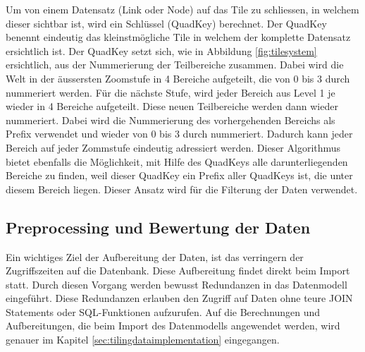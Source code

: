 Um von einem Datensatz (Link oder Node) auf das Tile zu schliessen, in welchem dieser sichtbar ist, wird ein Schlüssel (QuadKey) berechnet. Der QuadKey benennt eindeutig das kleinstmögliche Tile in welchem der komplette Datensatz ersichtlich ist. Der QuadKey setzt sich, wie in Abbildung \ref{fig:tilesystem} ersichtlich, aus der Nummerierung der Teilbereiche zusammen. Dabei wird die Welt in der äussersten Zoomstufe in 4 Bereiche aufgeteilt, die von 0 bis 3 durch nummeriert werden. Für die nächste Stufe, wird jeder Bereich aus Level 1 je wieder in 4 Bereiche aufgeteilt. Diese neuen Teilbereiche werden dann wieder nummeriert. Dabei wird die Nummerierung des vorhergehenden Bereichs als Prefix verwendet und wieder von 0 bis 3 durch nummeriert. Dadurch kann jeder Bereich auf jeder Zommstufe eindeutig adressiert werden. Dieser Algorithmus bietet ebenfalls die Möglichkeit, mit Hilfe des QuadKeys alle darunterliegenden Bereiche zu finden, weil dieser QuadKey ein Prefix aller QuadKeys ist, die unter diesem Bereich liegen. Dieser Ansatz wird für die Filterung der Daten verwendet.
\subsection{Preprocessing und Bewertung der Daten}\label{sec:concept_preprocessing}
Ein wichtiges Ziel der Aufbereitung der Daten, ist das verringern der Zugriffszeiten auf die Datenbank. Diese Aufbereitung findet direkt beim Import statt. Durch diesen Vorgang werden bewusst Redundanzen in das Datenmodell eingeführt. Diese Redundanzen erlauben den Zugriff auf Daten ohne teure JOIN Statements oder SQL-Funktionen aufzurufen. Auf die Berechnungen und Aufbereitungen, die beim Import des Datenmodells angewendet werden, wird genauer im Kapitel \ref{sec:tilingdataimplementation}  eingegangen.
\newpage
